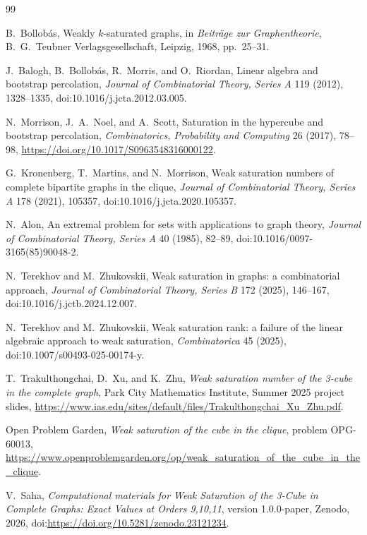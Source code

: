 \documentclass[11pt]{article}
\numberwithin{equation}{section}
\begin{document}
\begingroup\sloppy
\begin{thebibliography}{99}

B.~Bollob\'as,
\newblock Weakly $k$-saturated graphs,
\newblock in \emph{Beitr\"age zur Graphentheorie}, B.~G.~Teubner Verlagsgesellschaft, Leipzig, 1968, pp.~25--31.

J.~Balogh, B.~Bollob\'as, R.~Morris, and O.~Riordan,
\newblock Linear algebra and bootstrap percolation,
\newblock \emph{Journal of Combinatorial Theory, Series A} 119 (2012), 1328--1335,
\newblock doi:10.1016/j.jcta.2012.03.005.

N.~Morrison, J.~A.~Noel, and A.~Scott,
Saturation in the hypercube and bootstrap percolation, \emph{Combinatorics, Probability and Computing} 26 (2017), 78--98, \url{https://doi.org/10.1017/S0963548316000122}.

G.~Kronenberg, T.~Martins, and N.~Morrison,
\newblock Weak saturation numbers of complete bipartite graphs in the clique,
\newblock \emph{Journal of Combinatorial Theory, Series A} 178 (2021), 105357,
\newblock doi:10.1016/j.jcta.2020.105357.

N.~Alon,
\newblock An extremal problem for sets with applications to graph theory,
\newblock \emph{Journal of Combinatorial Theory, Series A} 40 (1985), 82--89,
\newblock doi:10.1016/0097-3165(85)90048-2.

N.~Terekhov and M.~Zhukovskii,
\newblock Weak saturation in graphs: a combinatorial approach,
\newblock \emph{Journal of Combinatorial Theory, Series B} 172 (2025), 146--167,
\newblock doi:10.1016/j.jctb.2024.12.007.

N.~Terekhov and M.~Zhukovskii,
\newblock Weak saturation rank: a failure of the linear algebraic approach to weak saturation,
\newblock \emph{Combinatorica} 45 (2025),
\newblock doi:10.1007/s00493-025-00174-y.

T.~Trakulthongchai, D.~Xu, and K.~Zhu,
\newblock \emph{Weak saturation number of the 3-cube in the complete graph},
\newblock Park City Mathematics Institute, Summer 2025 project slides,
\newblock \url{https://www.ias.edu/sites/default/files/Trakulthongchai_Xu_Zhu.pdf}.

Open Problem Garden,
\newblock \emph{Weak saturation of the cube in the clique}, problem OPG-60013,
\newblock \url{https://www.openproblemgarden.org/op/weak_saturation_of_the_cube_in_the_clique}.

V.~Saha,
\newblock \emph{Computational materials for Weak Saturation of the 3-Cube in Complete Graphs: Exact Values at Orders 9,10,11},
\newblock version 1.0.0-paper,
\newblock Zenodo, 2026,
\newblock doi:\url{https://doi.org/10.5281/zenodo.23121234}.


\end{thebibliography}
\endgroup
\end{document}
